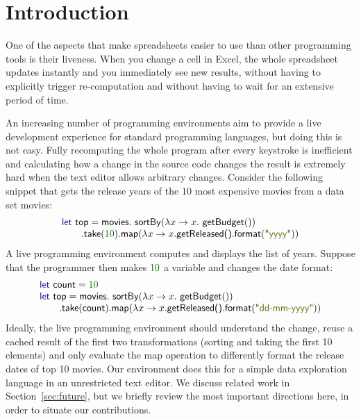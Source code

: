\documentclass[english,crc]{programming}
\theoremstyle{plain}
\theoremstyle{definition}
\newcommand{\num}[1]{\textcolor{numclr}{#1}}
\newcommand{\str}[1]{\textnormal{\textcolor{strclr}{\sffamily "#1"}}}
\newcommand{\ident}[1]{\textnormal{\textcolor{idclr}{\sffamily #1}}}
\newcommand{\kvd}[1]{\textnormal{\textcolor{kvdclr}{\sffamily #1}}}
\begin{document}
\section{Introduction}
\label{sec:intro}
One of the aspects that make spreadsheets easier to use than other programming tools is their
liveness. When you change a cell in Excel, the whole spreadsheet updates instantly
and you immediately see new results, without having to explicitly trigger re-computation
and without having to wait for an extensive period of time.

An increasing number of programming environments aim to provide a live development experience
for standard programming languages, but doing this is not easy. Fully recomputing the whole program
after every keystroke is inefficient and calculating how a change in the source code changes the
result is extremely hard when the text editor allows arbitrary changes.
Consider the following snippet that gets the release years of the $10$ most expensive movies from a
data set \ident{movies}:
%
\begin{equation*}
\begin{array}{l}
\kvd{let}~\ident{top} =\ident{movies}.\ident{sortBy}(\lambda x \rightarrow x.\ident{getBudget}())\\
\qquad .\ident{take}(\num{10}).\ident{map}(\lambda x \rightarrow x.\ident{getReleased()}.\ident{format}(\str{yyyy}))\\
\end{array}
\end{equation*}
%
A live programming environment computes and displays the list of years. Suppose that the programmer then
makes $\num{10}$ a variable and changes the date format:
%
\begin{equation*}
\begin{array}{l}
\kvd{let}~\ident{count} = \num{10}\\
\kvd{let}~\ident{top} = \ident{movies}.\ident{sortBy}(\lambda x \rightarrow x.\ident{getBudget}())\\
\qquad .\ident{take}(\ident{count}).\ident{map}(\lambda x \rightarrow x.\ident{getReleased()}.\ident{format}(\str{dd-mm-yyyy}))\\
\end{array}
\end{equation*}
%
Ideally, the live programming environment should understand the change, reuse a cached result of the
first two transformations (sorting and taking the first 10 elements) and only evaluate the
\ident{map} operation to differently format the release dates of top 10 movies. Our environment
does this for a simple data exploration language in an unrestricted text editor. We discuss related
work in Section~\ref{sec:future}, but we briefly review the most important directions here, in
order to situate our contributions.
\end{document}

